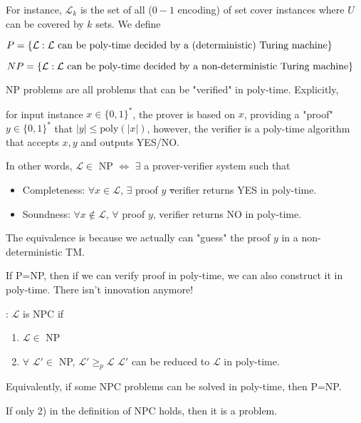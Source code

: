 For instance, $ \mathcal{L}_k $  is the set of all ($ 0-1 $ encoding) of set cover instances where  $ U  $ can be covered by  $ k  $ sets. We define 
\begin{center}
    $ \displaystyle P=\{\mathcal{L}:\mathcal{L}\text{ can be poly-time decided by a (deterministic) Turing machine}\} $ 
\end{center}
\begin{center}
    $ \displaystyle NP=\{\mathcal{L}:\mathcal{L}\text{ can be poly-time decided by a non-deterministic Turing machine}\} $
\end{center}

NP problems are all problems that can be "verified" in poly-time. Explicitly,

for input instance  $ x\in \{0,1\}^\ast $, the prover is based on  $ x $, providing a "proof"  $ y\in \{0,1\}^\ast $ that  $ |y| \leq \mathrm{poly}(|x|) $, however, the verifier is a poly-time algorithm that accepts   $ x,y  $ and outputs YES/NO.

In other words,  $ \mathcal{L}\in  $ NP  $ \Leftrightarrow $   $ \exists $ a prover-verifier system such that 
\begin{itemize}
    \item Completeness:  $ \forall x\in \mathcal{L} $,  $ \exists $ proof $ y $ \st verifier returns YES in poly-time.
    \item Soundness: $ \forall x\not\in \mathcal{L} $, $ \forall  $  proof  $ y $, verifier returns  NO in poly-time.     
\end{itemize} 
The equivalence is because we actually can "guess" the proof  $ y  $ in a non-deterministic TM.

If P=NP, then if we can verify  proof in poly-time, we can also construct it in poly-time. There isn't innovation anymore!

:  $ \mathcal{L} $ is NPC if 
\begin{enumerate}[label=\arabic*)]
    \item  $ \mathcal{L}\in  $ NP 
    \item  $ \forall  $  $ \mathcal{L}'\in  $ NP,  $ \mathcal{L}' \geq_p\mathcal{L} $ \ie  $ \mathcal{L}' $ can be reduced to  $ \mathcal{L} $ in poly-time.      
\end{enumerate} 

Equivalently, if some NPC problems can be solved in poly-time, then P=NP.

If only 2) in the definition of NPC holds, then it is a  problem.